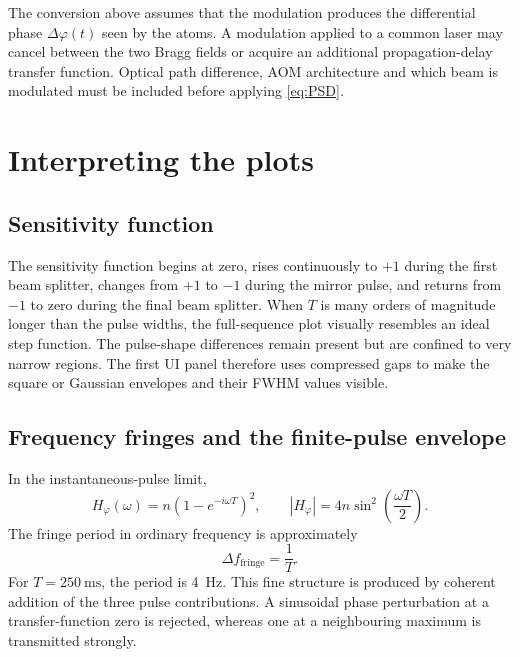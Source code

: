 \documentclass[11pt,a4paper]{article}
\newcommand{\Hphi}{H_{\varphi}}
\begin{document}
\begin{warningbox}
The conversion above assumes that the modulation produces the differential phase $\Delta\varphi(t)$ seen by the atoms. A modulation applied to a common laser may cancel between the two Bragg fields or acquire an additional propagation-delay transfer function. Optical path difference, AOM architecture and which beam is modulated must be included before applying \cref{eq:PSD}.
\end{warningbox}

\section{Interpreting the plots}

\subsection{Sensitivity function}

The sensitivity function begins at zero, rises continuously to $+1$ during the first beam splitter, changes from $+1$ to $-1$ during the mirror pulse, and returns from $-1$ to zero during the final beam splitter. When $T$ is many orders of magnitude longer than the pulse widths, the full-sequence plot visually resembles an ideal step function. The pulse-shape differences remain present but are confined to very narrow regions. The first UI panel therefore uses compressed gaps to make the square or Gaussian envelopes and their FWHM values visible.

\subsection{Frequency fringes and the finite-pulse envelope}

In the instantaneous-pulse limit,
\begin{equation}
\Hphi(\omega)=n(1-e^{-i\omega T})^2,
\qquad |\Hphi|=4n\sin^2\left(\frac{\omega T}{2}\right).
\label{eq:instantaneous}
\end{equation}
The fringe period in ordinary frequency is approximately
\begin{equation}
\boxed{\Delta f_{\mathrm{fringe}}=\frac{1}{T}.}
\end{equation}
For $T=\SI{250}{\milli\second}$, the period is \SI{4}{\hertz}. This fine structure is produced by coherent addition of the three pulse contributions. A sinusoidal phase perturbation at a transfer-function zero is rejected, whereas one at a neighbouring maximum is transmitted strongly.
\end{document}
